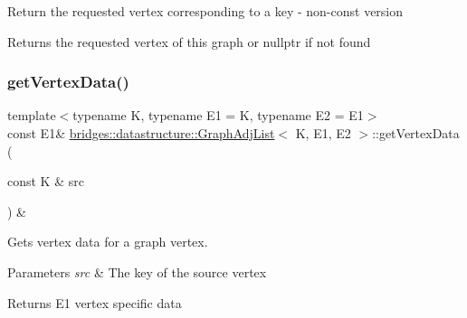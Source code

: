 Return the requested vertex corresponding to a key -\/ non-\/const version \begin{DoxyReturn}{Returns}
the requested vertex of this graph or nullptr if not found 
\end{DoxyReturn}
\mbox{\label{classbridges_1_1datastructure_1_1_graph_adj_list_a3a9d3875e7f6eb0d4c3500c53957b9c1}} 
\subsubsection{\texorpdfstring{get\+Vertex\+Data()}{getVertexData()}}
{\footnotesize\ttfamily template$<$typename K, typename E1 = K, typename E2 = E1$>$ \\
const E1\& \hyperlink{classbridges_1_1datastructure_1_1_graph_adj_list}{bridges\+::datastructure\+::\+Graph\+Adj\+List}$<$ K, E1, E2 $>$\+::get\+Vertex\+Data (\begin{DoxyParamCaption}\item[{const K \&}]{src }\end{DoxyParamCaption}) \&\hspace{0.3cm}{\ttfamily [inline]}}



Gets vertex data for a graph vertex. 


\begin{DoxyParams}{Parameters}
{\em src} & The key of the source vertex\\
\hline
\end{DoxyParams}
\begin{DoxyReturn}{Returns}
E1 vertex specific data 
\end{DoxyReturn}
\mbox{\label{classbridges_1_1datastructure_1_1_graph_adj_list_af91334de325f4be241c3c939ea9c5a36}} 
